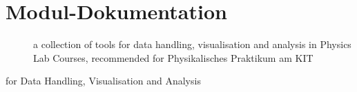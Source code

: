 \documentclass[letterpaper,10pt,english]{sphinxmanual}
\begin{document}
\chapter{Modul-Dokumentation}
\label{\detokenize{index:module-PhyPraKit}}\label{\detokenize{index:modul-dokumentation}}\begin{description}
\item[{  }] \leavevmode
a collection of tools for data handling, visualisation and analysis 
in Physics Lab Courses, recommended for \sphinxquotedblleft{}Physikalisches Praktikum am KIT\sphinxquotedblright{}

\end{description}
\label{\detokenize{index:module-PhyPraKit.PhyPraKit}}
  for Data Handling, Visualisation and Analysis
\end{document}
